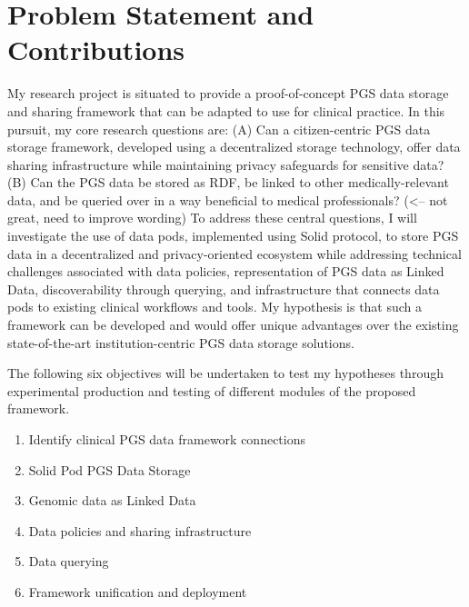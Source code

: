 \documentclass[runningheads]{llncs}
\begin{document}
\section{Problem Statement and Contributions}

My research project is situated to provide a proof-of-concept PGS data storage and sharing framework that can be adapted to use for clinical practice. In this pursuit, my core research questions are: 
(A) Can a citizen-centric PGS data storage framework, developed using a decentralized storage technology, offer data sharing infrastructure while maintaining privacy safeguards for sensitive data? 
(B) Can the PGS data be stored as RDF, be linked to other medically-relevant data, and be queried over in a way beneficial to medical professionals? (<-- not great, need to improve wording)
To address these central questions, I will investigate the use of data pods, implemented using Solid protocol, to store PGS data in a decentralized and privacy-oriented ecosystem while addressing technical challenges associated with data policies, representation of PGS data as Linked Data, discoverability through querying, and infrastructure that connects data pods to existing clinical workflows and tools. 
My hypothesis is that such a framework can be developed and would offer unique advantages over the existing state-of-the-art institution-centric PGS data storage solutions. 

The following six objectives will be undertaken to test my hypotheses through experimental production and testing of different modules of the proposed framework.
\begin{enumerate}
    \item Identify clinical PGS data framework connections
    \item Solid Pod PGS Data Storage
    \item Genomic data as Linked Data
    \item Data policies and sharing infrastructure
    \item Data querying
    \item Framework unification and deployment
\end{enumerate}
\end{document}
